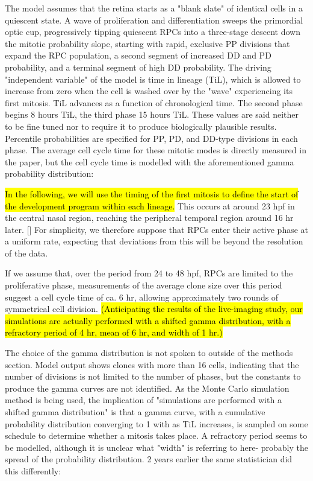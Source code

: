 The model assumes that the retina starts as a "blank slate" of identical cells in a quiescent state. A wave of proliferation and differentiation sweeps the primordial optic cup, progressively tipping quiescent RPCs into a three-stage descent down the mitotic probability slope, starting with rapid, exclusive PP divisions that expand the RPC population, a second segment of increased DD and PD probability, and a terminal segment of high DD probability. The driving "independent variable" of the model is time in lineage (TiL), which is allowed to increase from zero when the cell is washed over by the "wave" experiencing its first mitosis. TiL advances as a function of chronological time. The second phase begins 8 hours TiL, the third phase 15 hours TiL. These values are said neither to be fine tuned nor to require it to produce biologically plausible results. Percentile probabilities are specified for PP, PD, and DD-type divisions in each phase. The average cell cycle time for these mitotic modes is directly measured in the paper, but the cell cycle time is modelled with the aforementioned gamma probability distribution:

\bigskip

\begin{longquote}
\hl{In the following, we will use the timing of the first mitosis to define the
start of the development program within each lineage.} This occurs at around
23 hpf in the central nasal region, reaching the peripheral temporal region
around 16 hr later. [] For simplicity, we therefore suppose that RPCs enter their
active phase at a uniform rate, expecting that deviations from this will be
beyond the resolution of the data.

If we assume that, over the period from 24 to 48 hpf, RPCs are limited to the
proliferative phase, measurements of the average clone size over this period
suggest a cell cycle time of ca. 6 hr, allowing approximately two rounds of
symmetrical cell division. \hl{(Anticipating the results of the live-imaging study,
our simulations are actually performed with a shifted gamma distribution,
with a refractory period of 4 hr, mean of 6 hr, and width of 1 hr.)}
\end{longquote}

\bigskip

The choice of the gamma distribution is not spoken to outside of the methods section. Model output shows clones with more than 16 cells, indicating that the number of divisions is not limited to the number of phases, but the constants to produce the gamma curves are not identified. As the Monte Carlo simulation method is being used, the implication of "simulations are performed with a shifted gamma distribution" is that a gamma curve, with a cumulative probability distribution converging to 1 with as TiL increases, is sampled on some schedule to determine whether a mitosis takes place. A refractory period seems to be modelled, although it is unclear what "width" is referring to here- probably the spread of the probability distribution. 2 years earlier \cite{Gomes2011} the same statistician did this differently:

